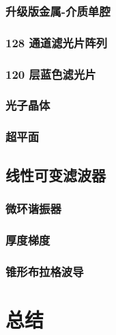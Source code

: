 \documentclass[9 pt,makeindex]{beamer}
\begin{document}
\subsubsection{升级版金属-介质单腔}

\subsubsection{128 通道滤光片阵列}

\subsubsection{120 层蓝色滤光片}

\subsubsection{光子晶体}

\subsubsection{超平面}


\subsection{线性可变滤波器}
\subsubsection{微环谐振器}

\subsubsection{厚度梯度}

\subsubsection{锥形布拉格波导}



\section{总结}

\end{document}

